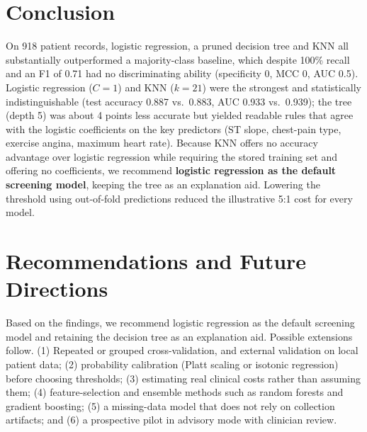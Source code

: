 \documentclass[12pt,a4paper]{article}
\begin{document}
\section{Conclusion}
On 918 patient records, logistic regression, a pruned decision tree and KNN all substantially outperformed a majority-class baseline, which despite 100\% recall and an F1 of 0.71 had no discriminating ability (specificity 0, MCC 0, AUC 0.5). Logistic regression ($C=1$) and KNN ($k=21$) were the strongest and statistically indistinguishable (test accuracy 0.887 vs.\ 0.883, AUC 0.933 vs.\ 0.939); the tree (depth 5) was about 4 points less accurate but yielded readable rules that agree with the logistic coefficients on the key predictors (ST slope, chest-pain type, exercise angina, maximum heart rate). Because KNN offers no accuracy advantage over logistic regression while requiring the stored training set and offering no coefficients, we recommend \textbf{logistic regression as the default screening model}, keeping the tree as an explanation aid. Lowering the threshold using out-of-fold predictions reduced the illustrative 5:1 cost for every model.

\section{Recommendations and Future Directions}
Based on the findings, we recommend logistic regression as the default screening model and retaining the decision tree as an explanation aid. Possible extensions follow.
 (1) Repeated or grouped cross-validation, and external validation on local patient data; (2) probability calibration (Platt scaling or isotonic regression) before choosing thresholds; (3) estimating real clinical costs rather than assuming them; (4) feature-selection and ensemble methods such as random forests and gradient boosting; (5) a missing-data model that does not rely on collection artifacts; and (6) a prospective pilot in advisory mode with clinician review.
\end{document}
